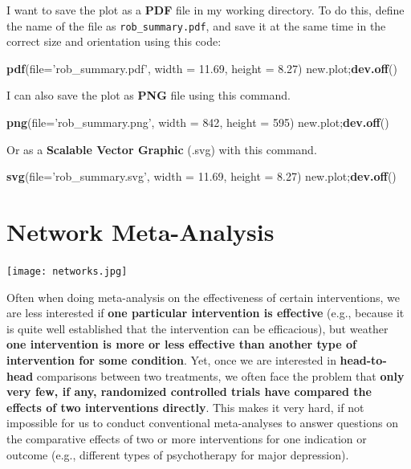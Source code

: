 \documentclass[]{book}
\newenvironment{Shaded}{\begin{snugshade}}{\end{snugshade}}
\newcommand{\DataTypeTok}[1]{\textcolor[rgb]{0.13,0.29,0.53}{#1}}
\newcommand{\DecValTok}[1]{\textcolor[rgb]{0.00,0.00,0.81}{#1}}
\newcommand{\FloatTok}[1]{\textcolor[rgb]{0.00,0.00,0.81}{#1}}
\newcommand{\KeywordTok}[1]{\textcolor[rgb]{0.13,0.29,0.53}{\textbf{#1}}}
\newcommand{\NormalTok}[1]{#1}
\newcommand{\StringTok}[1]{\textcolor[rgb]{0.31,0.60,0.02}{#1}}
\begin{document}
I want to save the plot as a \textbf{PDF} file in my working directory. To do this, define the name of the file as \texttt{rob\_summary.pdf}, and save it at the same time in the correct size and orientation using this code:

\begin{Shaded}
\begin{Highlighting}[]
\KeywordTok{pdf}\NormalTok{(}\DataTypeTok{file=}\StringTok{'rob_summary.pdf'}\NormalTok{, }\DataTypeTok{width =} \FloatTok{11.69}\NormalTok{, }\DataTypeTok{height =} \FloatTok{8.27}\NormalTok{) }
\NormalTok{new.plot;}\KeywordTok{dev.off}\NormalTok{() }
\end{Highlighting}
\end{Shaded}

I can also save the plot as \textbf{PNG} file using this command.

\begin{Shaded}
\begin{Highlighting}[]
\KeywordTok{png}\NormalTok{(}\DataTypeTok{file=}\StringTok{'rob_summary.png'}\NormalTok{, }\DataTypeTok{width =} \DecValTok{842}\NormalTok{, }\DataTypeTok{height =} \DecValTok{595}\NormalTok{) }
\NormalTok{new.plot;}\KeywordTok{dev.off}\NormalTok{() }
\end{Highlighting}
\end{Shaded}

Or as a \textbf{Scalable Vector Graphic} (.svg) with this command.

\begin{Shaded}
\begin{Highlighting}[]
\KeywordTok{svg}\NormalTok{(}\DataTypeTok{file=}\StringTok{'rob_summary.svg'}\NormalTok{, }\DataTypeTok{width =} \FloatTok{11.69}\NormalTok{, }\DataTypeTok{height =} \FloatTok{8.27}\NormalTok{) }
\NormalTok{new.plot;}\KeywordTok{dev.off}\NormalTok{() }
\end{Highlighting}
\end{Shaded}

\hypertarget{network-meta-analysis}{%
\chapter{Network Meta-Analysis}\label{network-meta-analysis}}

\texttt{[image: networks.jpg]}

Often when doing meta-analysis on the effectiveness of certain interventions, we are less interested if \textbf{one particular intervention is effective} (e.g., because it is quite well established that the intervention can be efficacious), but weather \textbf{one intervention is more or less effective than another type of intervention for some condition}. Yet, once we are interested in \textbf{head-to-head} comparisons between two treatments, we often face the problem that \textbf{only very few, if any, randomized controlled trials have compared the effects of two interventions directly}. This makes it very hard, if not impossible for us to conduct conventional meta-analyses to answer questions on the comparative effects of two or more interventions for one indication or outcome (e.g., different types of psychotherapy for major depression).
\end{document}

